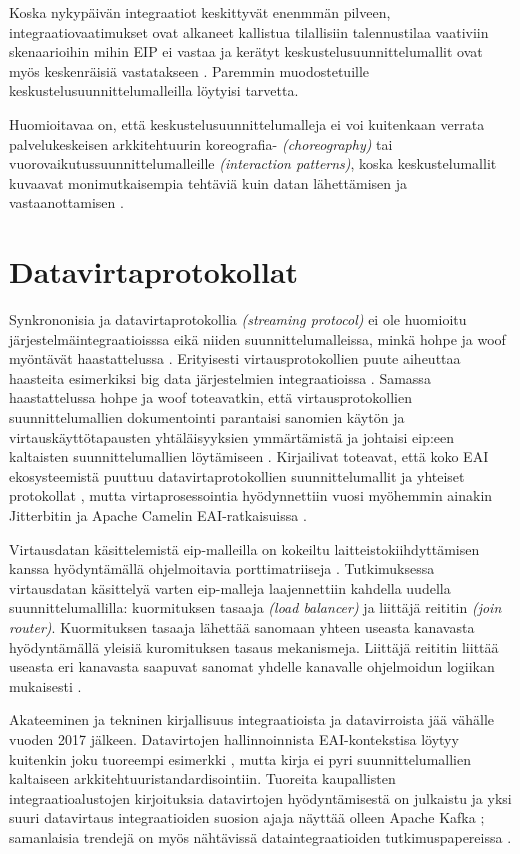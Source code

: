 Koska nykypäivän integraatiot keskittyvät enenmmän pilveen, integraatiovaatimukset ovat alkaneet kallistua tilallisiin talennustilaa vaativiin skenaarioihin mihin EIP ei vastaa ja kerätyt keskustelusuunnittelumallit ovat myös keskenräisiä vastatakseen \citep{Ritter2017}. Paremmin muodostetuille keskustelusuunnittelumalleilla löytyisi tarvetta.

Huomioitavaa on, että keskustelusuunnittelumalleja ei voi kuitenkaan verrata palvelukeskeisen arkkitehtuurin koreografia- \textit{(choreography)} tai vuorovaikutussuunnittelumalleille \textit{(interaction patterns)}, koska 
keskustelumallit kuvaavat monimutkaisempia tehtäviä kuin datan lähettämisen ja vastaanottamisen \citep{Ritter2017}.

\section{Datavirtaprotokollat}
Synkrononisia ja datavirtaprotokollia \textit{(streaming protocol)} ei  ole huomioitu järjestelmäintegraatioisssa eikä niiden suunnittelumalleissa, minkä hohpe ja woof myöntävät haastattelussa \citep{Zimmermann2016}. Erityisesti virtausprotokollien puute aiheuttaa haasteita esimerkiksi big data järjestelmien integraatioissa \citep{Ritter2017}.
Samassa haastattelussa hohpe ja woof toteavatkin, että virtausprotokollien suunnittelumallien dokumentointi parantaisi sanomien käytön ja virtauskäyttötapausten yhtäläisyyksien ymmärtämistä ja johtaisi eip:een kaltaisten suunnittelumallien löytämiseen \citep{Ritter2017}.
Kirjailivat toteavat, että koko EAI ekosysteemistä puuttuu datavirtaprotokollien suunnittelumallit ja yhteiset protokollat \citep{Zimmermann2016}, mutta virtaprosessointia hyödynnettiin vuosi myöhemmin ainakin Jitterbitin ja Apache Camelin EAI-ratkaisuissa \citep{Ritter2017}.

Virtausdatan käsittelemistä eip-malleilla on kokeiltu laitteistokiihdyttämisen kanssa hyödyntämällä ohjelmoitavia porttimatriiseja \citep{DannRitter2017}. Tutkimuksessa virtausdatan käsittelyä varten eip-malleja laajennettiin kahdella uudella suunnittelumallilla: kuormituksen tasaaja \textit{(load balancer)} ja liittäjä reititin \textit{(join router)}. Kuormituksen tasaaja lähettää sanomaan yhteen useasta kanavasta hyödyntämällä yleisiä kuromituksen tasaus mekanismeja. Liittäjä reititin liittää useasta eri kanavasta saapuvat sanomat yhdelle kanavalle ohjelmoidun logiikan mukaisesti \citep{DannRitter2017}.


Akateeminen ja tekninen kirjallisuus integraatioista ja datavirroista jää vähälle vuoden 2017 jälkeen. Datavirtojen hallinnoinnista EAI-kontekstisa löytyy kuitenkin joku tuoreempi esimerkki \citep{WilkesPareek}, mutta kirja ei pyri suunnittelumallien kaltaiseen arkkitehtuuristandardisointiin. 
Tuoreita kaupallisten integraatioalustojen kirjoituksia datavirtojen hyödyntämisestä on julkaistu ja yksi suuri datavirtaus integraatioiden suosion ajaja näyttää olleen Apache Kafka \citep{WSO2Stream} \citep{IBMStream}; samanlaisia trendejä on myös nähtävissä dataintegraatioiden tutkimuspapereissa \citep{Bousdekis2021}.

